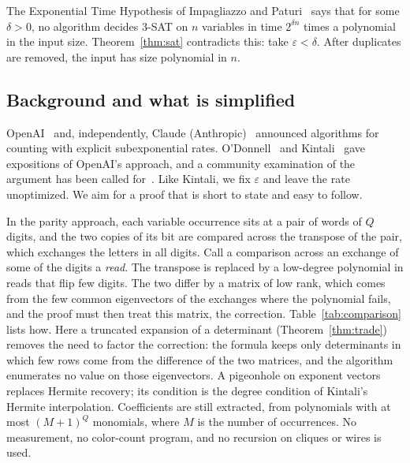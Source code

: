 \documentclass[11pt]{article}
\numberwithin{equation}{section}
\theoremstyle{remark}
\begin{document}
The Exponential Time Hypothesis of Impagliazzo and Paturi~\cite{IP01} says that for some $\delta>0$, no algorithm decides 3-SAT on $n$ variables in time $2^{\delta n}$ times a polynomial in the input size. Theorem~\ref{thm:sat} contradicts this: take $\varepsilon<\delta$. After duplicates are removed, the input has size polynomial in $n$.

\subsection{Background and what is simplified}\label{sec:comparison}

OpenAI~\cite{OAI26} and, independently, Claude (Anthropic)~\cite{Cla26} announced algorithms for counting with explicit subexponential rates. O'Donnell~\cite{OD26} and Kintali~\cite{Kin26} gave expositions of OpenAI's approach, and a community examination of the argument has been called for~\cite{ETHblog}. Like Kintali, we fix $\varepsilon$ and leave the rate unoptimized. We aim for a proof that is short to state and easy to follow.

In the parity approach, each variable occurrence sits at a pair of words of $Q$ digits, and the two copies of its bit are compared across the transpose of the pair, which exchanges the letters in all digits. Call a comparison across an exchange of some of the digits a \emph{read}. The transpose is replaced by a low-degree polynomial in reads that flip few digits. The two differ by a matrix of low rank, which comes from the few common eigenvectors of the exchanges where the polynomial fails, and the proof must then treat this matrix, the correction. Table~\ref{tab:comparison} lists how. Here a truncated expansion of a determinant (Theorem~\ref{thm:trade}) removes the need to factor the correction: the formula keeps only determinants in which few rows come from the difference of the two matrices, and the algorithm enumerates no value on those eigenvectors. A pigeonhole on exponent vectors replaces Hermite recovery; its condition is the degree condition of Kintali's Hermite interpolation. Coefficients are still extracted, from polynomials with at most $(M+1)^Q$ monomials, where $M$ is the number of occurrences. No measurement, no color-count program, and no recursion on cliques or wires is used.
\end{document}
